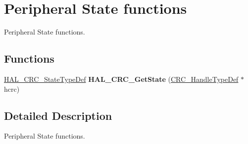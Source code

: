 \hypertarget{group___c_r_c___exported___functions___group3}{}\section{Peripheral State functions}
\label{group___c_r_c___exported___functions___group3}


Peripheral State functions.  


\subsection*{Functions}
\begin{DoxyCompactItemize}
\item 
\mbox{\label{group___c_r_c___exported___functions___group3_ga4fb3d3460bd83853c28215bc5e14babe}} 
\hyperlink{group___c_r_c___exported___types_ga1021d6f27a072d45f6f3b233eefd8bbe}{H\+A\+L\+\_\+\+C\+R\+C\+\_\+\+State\+Type\+Def} {\bfseries H\+A\+L\+\_\+\+C\+R\+C\+\_\+\+Get\+State} (\hyperlink{struct_c_r_c___handle_type_def}{C\+R\+C\+\_\+\+Handle\+Type\+Def} $\ast$hcrc)
\end{DoxyCompactItemize}


\subsection{Detailed Description}
Peripheral State functions. 

